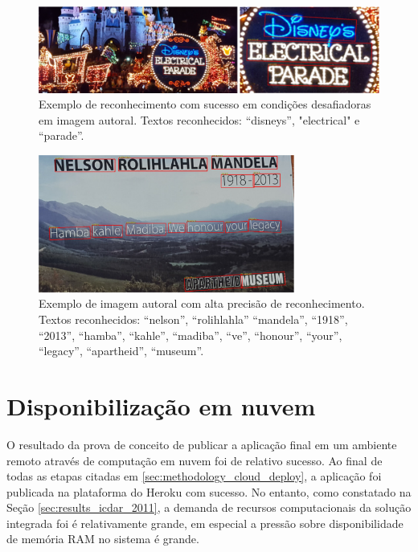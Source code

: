 \begin{figure}
    \centering
    \includegraphics[width=\textwidth]{figs/resultados-autoral-04.png}
    \caption{Exemplo de reconhecimento com sucesso em condições desafiadoras em imagem autoral. Textos reconhecidos: “disneys”, 
    "electrical" e “parade”.}
    \label{fig:results_own_images_04}
\end{figure}

\begin{figure}
    \centering
    \includegraphics[width=0.75\textwidth]{figs/resultados-autoral-05.png}
    \caption{Exemplo de imagem autoral com alta precisão de reconhecimento. Textos reconhecidos: “nelson”, “rolihlahla” “mandela”, 
    “1918”, “2013”, “hamba”, “kahle”, “madiba”, “ve”, “honour”, “your”, “legacy”, “apartheid”, “museum”.}
    \label{fig:results_own_images_05}
\end{figure}


\section{Disponibilização em nuvem}
O resultado da prova de conceito de publicar a aplicação final em um ambiente remoto através de computação em nuvem foi de relativo 
sucesso. Ao final de todas as etapas citadas em \ref{sec:methodology_cloud_deploy}, a aplicação foi publicada na plataforma do 
Heroku com sucesso. No entanto, como constatado na Seção \ref{sec:results_icdar_2011}, a demanda de recursos computacionais da 
solução integrada foi é relativamente grande, em especial a pressão sobre disponibilidade de memória RAM no sistema é grande.

